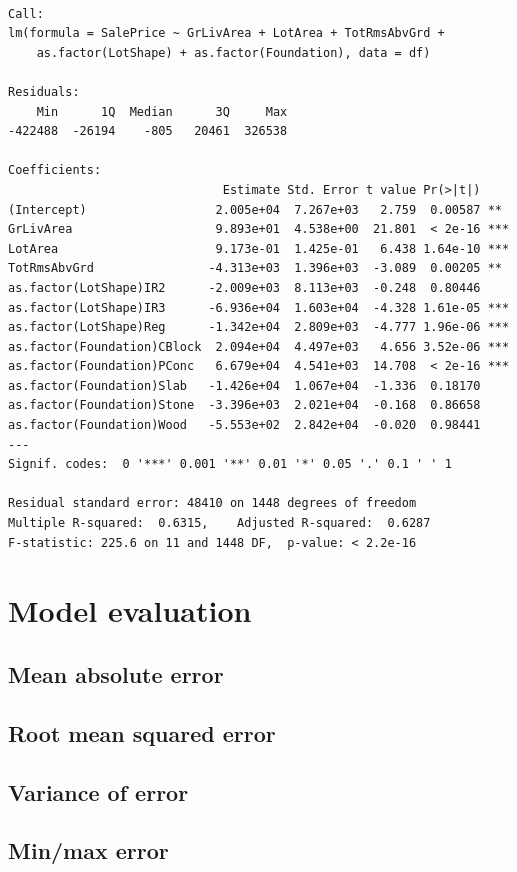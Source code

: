 \documentclass[
  letterpaper,
  DIV=11,
  numbers=noendperiod]{scrreprt}
\begin{document}
\begin{verbatim}

Call:
lm(formula = SalePrice ~ GrLivArea + LotArea + TotRmsAbvGrd + 
    as.factor(LotShape) + as.factor(Foundation), data = df)

Residuals:
    Min      1Q  Median      3Q     Max 
-422488  -26194    -805   20461  326538 

Coefficients:
                              Estimate Std. Error t value Pr(>|t|)    
(Intercept)                  2.005e+04  7.267e+03   2.759  0.00587 ** 
GrLivArea                    9.893e+01  4.538e+00  21.801  < 2e-16 ***
LotArea                      9.173e-01  1.425e-01   6.438 1.64e-10 ***
TotRmsAbvGrd                -4.313e+03  1.396e+03  -3.089  0.00205 ** 
as.factor(LotShape)IR2      -2.009e+03  8.113e+03  -0.248  0.80446    
as.factor(LotShape)IR3      -6.936e+04  1.603e+04  -4.328 1.61e-05 ***
as.factor(LotShape)Reg      -1.342e+04  2.809e+03  -4.777 1.96e-06 ***
as.factor(Foundation)CBlock  2.094e+04  4.497e+03   4.656 3.52e-06 ***
as.factor(Foundation)PConc   6.679e+04  4.541e+03  14.708  < 2e-16 ***
as.factor(Foundation)Slab   -1.426e+04  1.067e+04  -1.336  0.18170    
as.factor(Foundation)Stone  -3.396e+03  2.021e+04  -0.168  0.86658    
as.factor(Foundation)Wood   -5.553e+02  2.842e+04  -0.020  0.98441    
---
Signif. codes:  0 '***' 0.001 '**' 0.01 '*' 0.05 '.' 0.1 ' ' 1

Residual standard error: 48410 on 1448 degrees of freedom
Multiple R-squared:  0.6315,    Adjusted R-squared:  0.6287 
F-statistic: 225.6 on 11 and 1448 DF,  p-value: < 2.2e-16
\end{verbatim}

\hypertarget{model-evaluation}{%
\section{Model evaluation}\label{model-evaluation}}

\hypertarget{mean-absolute-error}{%
\subsection{Mean absolute error}\label{mean-absolute-error}}

\hypertarget{root-mean-squared-error}{%
\subsection{Root mean squared error}\label{root-mean-squared-error}}

\hypertarget{variance-of-error}{%
\subsection{Variance of error}\label{variance-of-error}}

\hypertarget{minmax-error}{%
\subsection{Min/max error}\label{minmax-error}}
\end{document}
